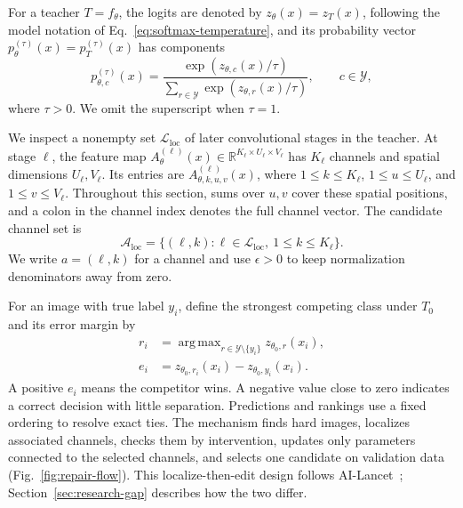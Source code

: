 \documentclass[10pt,journal,compsoc]{IEEEtran}
\theoremstyle{definition}
\DeclareMathOperator*{\argmax}{arg\,max}
\begin{document}
For a teacher $T=f_\theta$, the logits are denoted by
$z_\theta(x)=z_T(x)$, following the model notation of
Eq.~\eqref{eq:softmax-temperature}, and its
probability vector $p_\theta^{(\tau)}(x)=p_T^{(\tau)}(x)$ has
components
\begin{equation}
\label{eq:repair-probabilities}
p_{\theta,c}^{(\tau)}(x)=
\frac{\exp(z_{\theta,c}(x)/\tau)}
{\sum_{r\in\mathcal{Y}}\exp(z_{\theta,r}(x)/\tau)},
\qquad c\in\mathcal{Y},
\end{equation}
where $\tau>0$. We omit the superscript when $\tau=1$.

We inspect a nonempty set $\mathcal{L}_{\mathrm{loc}}$ of
later convolutional stages in the teacher. At stage $\ell$,
the feature map
$A_\theta^{(\ell)}(x)\in
\mathbb{R}^{K_\ell\times U_\ell\times V_\ell}$
has $K_\ell$ channels and spatial dimensions $U_\ell,V_\ell$.
Its entries are $A_{\theta,k,u,v}^{(\ell)}(x)$, where
$1\leq k\leq K_\ell$, $1\leq u\leq U_\ell$, and
$1\leq v\leq V_\ell$. Throughout this section, sums over
$u,v$ cover these spatial positions, and a colon in the
channel index denotes the full channel vector.
The candidate channel set is
\begin{equation}
\mathcal{A}_{\mathrm{loc}}=
\{(\ell,k):\ell\in\mathcal{L}_{\mathrm{loc}},
                  \ 1\leq k\leq K_\ell\}.
\end{equation}
We write $a=(\ell,k)$ for a channel and use $\epsilon>0$
to keep normalization denominators away from zero.

For an image with true label $y_i$, define the strongest
competing class under $T_0$ and its error margin by
\begin{equation}
\label{eq:repair-error-margin}
\begin{aligned}
r_i&=\argmax_{r\in\mathcal{Y}\setminus\{y_i\}}
                 z_{\theta_0,r}(x_i),\\
e_i&=z_{\theta_0,r_i}(x_i)-z_{\theta_0,y_i}(x_i).
\end{aligned}
\end{equation}
A positive $e_i$ means the competitor wins. A negative value
close to zero indicates a correct decision with little
separation. Predictions and rankings use a fixed ordering
to resolve exact ties. The mechanism finds hard images,
localizes associated channels, checks them by intervention,
updates only parameters connected to the selected channels,
and selects one candidate on validation data
(Fig.~\ref{fig:repair-flow}). This
localize-then-edit design follows AI-Lancet~\cite{zhao2021ailancet};
Section~\ref{sec:research-gap} describes how the two differ.
\vspace{-5pt}
\end{document}
